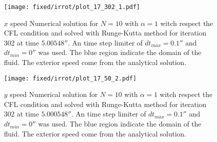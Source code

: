 \begin{figure}
\texttt{[image: fixed/irrot/plot\_17\_302\_1.pdf]}
\caption{$x$ speed Numerical solution for $N=10$ with $\alpha=1$ witch respect the CFL condition and solved with Runge-Kutta method
for iteration 302 at time $\unit{5.00548}{\second}$.
An time step limiter of $dt_{max}=\unit{0.1}{\second}$ and $dt_{min}=\unit{0}{\second}$ was used.
The blue region indicate the domain of the fluid. The exterior speed come from the analytical solution.
}
\end{figure}
\begin{figure}
\texttt{[image: fixed/irrot/plot\_17\_50\_2.pdf]}
\caption{$y$ speed Numerical solution for $N=10$ with $\alpha=1$ witch respect the CFL condition and solved with Runge-Kutta method
for iteration 302 at time $\unit{5.000548}{\second}$.
An time step limiter of $dt_{max}=\unit{0.1}{\second}$ and $dt_{min}=\unit{0}{\second}$ was used.
The blue region indicate the domain of the fluid. The exterior speed come from the analytical solution.
}
\end{figure}